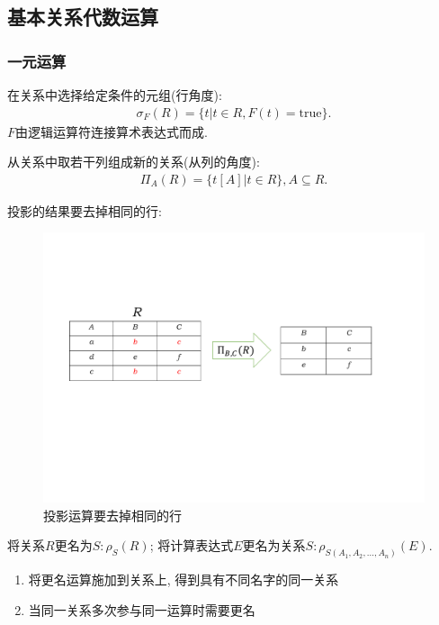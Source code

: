 \subsection{基本关系代数运算}

\subsubsection{一元运算}

\begin{definition}[选择运算]
在关系中选择给定条件的元组(行角度):
\begin{align*}
    \sigma_F(R)=\{t|t\in R,F(t)=\text{true}\}.
\end{align*}
$F$由逻辑运算符连接算术表达式而成.
\end{definition}

\begin{definition}[投影运算]
从关系中取若干列组成新的关系(从列的角度):
\begin{align*}
    \Pi_A(R) = \{t[A]|t\in R\}, A \subseteq R.
\end{align*}
\end{definition}

投影的结果要去掉相同的行:
\begin{figure}[H]
    \centering
    \includegraphics[width=.7\textwidth]{./figure/投影.pdf}
    \caption{投影运算要去掉相同的行}
\end{figure}

\begin{definition}[更名运算]
将关系$R$更名为$S: \rho_S(R)$; 将计算表达式$E$更名为关系$S: \rho_{S(A_1,A_2,...,A_n)}(E)$.
\begin{enumerate}
    \item 将更名运算施加到关系上, 得到具有不同名字的同一关系
    \item 当同一关系多次参与同一运算时需要更名
\end{enumerate}
\end{definition}

